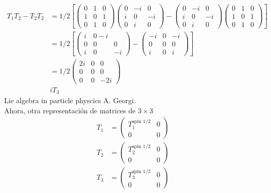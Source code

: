 \begin{align*}
  T_1T_2 - T_2 T_2 &  = 1/2 \left[ \begin{pmatrix} 0 & 1 & 0 \\ 1 & 0 & 1 \\ 0 & 1 & 0 \end{pmatrix} \begin{pmatrix} 0 & -i & 0 \\ i & 0 & -i \\ 0 & i & 0 \end{pmatrix}  - \begin{pmatrix}  0 & -i & 0 \\ i & 0 & -i \\ 0 & i & 0 \end{pmatrix}\begin{pmatrix}0 & 1 & 0 \\ 1 & 0 & 1 \\ 0 & 1 & 0 \end{pmatrix} \right] \\
& = 1/2\left[\begin{pmatrix} i & 0 -i \\ 0 & 0 & 0 \\ i & 0 & -i \end{pmatrix} - \begin{pmatrix} -i & 0 & -i \\ 0 & 0 & 0 \\ i & 0 & i \end{pmatrix}\right] \\
  & = 1/2 \begin{pmatrix} 2i & 0 & 0 \\ 0 & 0 & 0 \\ 0 & 0 & -2i \end{pmatrix} \\
    & iT_3
\end{align*}
Lie algebra in particle physcics A. Georgi. \\
Ahora, otra representación de matrices de $3\times 3$
\begin{align*}
  T_1 & = \begin{pmatrix} T_1^{\text{spin 1/2}} & 0 \\ 0 & 0 \end{pmatrix} \\
    T_2 & = \begin{pmatrix} T_2^{\text{spin 1/2}} & 0 \\ 0 & 0 \end{pmatrix} \\
      T_3 & = \begin{pmatrix} T_3^{\text{spin 1/2}} & 0 \\ 0 & 0 \end{pmatrix} 
\end{align*}
